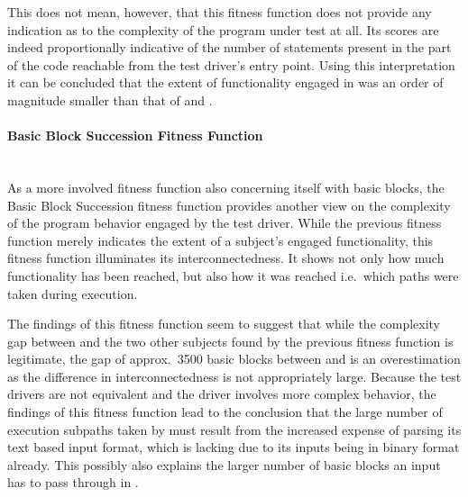 This does not mean, however, that this fitness function does not provide any indication as to the complexity of
the program under test at all. Its scores are indeed proportionally indicative of the number of statements
present in the part of the code reachable from the test driver's entry point. Using this interpretation it can
be concluded that the extent of functionality engaged in \libpcap was an order of magnitude smaller than that
of \libpng and \libxml.

\paragraph{Basic Block Succession Fitness Function} ~\\
As a more involved fitness function also concerning itself with basic blocks, the Basic Block Succession
fitness function provides another view on the complexity of the program behavior engaged by the test driver.
While the previous fitness function merely indicates the extent of a subject's engaged functionality, this
fitness function illuminates its interconnectedness. It shows not only how much functionality has been reached,
but also how it was reached i.e.\ which paths were taken during execution.

The findings of this fitness function seem to suggest that while the complexity gap between \libpcap and the
two other subjects found by the previous fitness function is legitimate, the gap of approx.\ 3500 basic blocks
between \libpng and \libxml is an overestimation as the difference in interconnectedness is not appropriately
large. Because the test drivers are not equivalent and the \libpng driver involves more complex
behavior, the findings of this fitness function lead to the conclusion that the large number of execution
subpaths taken by \libxml must result from the increased expense of parsing its text based input format, which
\libpng is lacking due to its inputs being in binary format already. This possibly also explains the larger
number of basic blocks an input has to pass through in \libxml.

